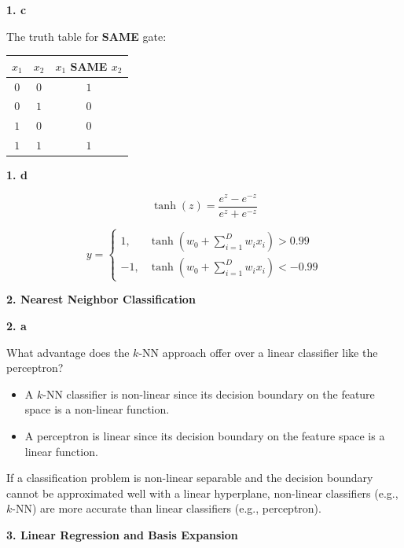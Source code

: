 \documentclass{article}
\begin{document}
\textbf{1. c}

The truth table for \textbf{SAME} gate:

\begin{table}[h]
    \centering
    \begin{tabular}{c|c|c}
    \hline
    $x_1$ & $x_2$ & $x_1$ SAME $x_2$  \\
    \hline 
    $ 0 $ & $ 0 $ & $  1 $ \\
    \hline
    $ 0 $ & $ 1 $ & $  0 $ \\
    \hline
    $ 1 $ & $ 0 $ & $  0 $ \\
    \hline
    $ 1 $ & $ 1 $ & $  1 $ \\
    \hline
    \end{tabular}
\end{table}

\textbf{1. d}

\[
\tanh(z)=\frac{e^z-e^{-z}}{e^z+e^{-z}}
\]

\[
y=
\begin{cases}
1, & \tanh\left(w_0+\sum_{i=1}^{D}w_ix_i \right)>0.99 \\
-1, & \tanh\left(w_0+\sum_{i=1}^{D}w_ix_i \right)<-0.99
\end{cases}
\]

\vspace{5mm}

\textbf{2. Nearest Neighbor Classification}

\textbf{2. a}

What advantage does the $k$-NN approach offer over a linear classifier like the perceptron?

\begin{itemize}
    \item A $k$-NN classifier is non-linear since its decision boundary on the feature space is a non-linear function.
    \item A perceptron is linear since its decision boundary on the feature space is a linear function.
\end{itemize}

If a classification problem is non-linear separable and the decision boundary cannot be approximated well with a linear hyperplane, non-linear classifiers (e.g., $k$-NN) are more accurate than linear classifiers (e.g., perceptron). 

\vspace{5mm}


\textbf{3. Linear Regression and Basis Expansion}
\end{document}
